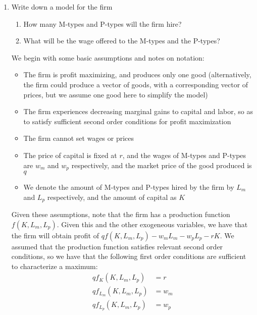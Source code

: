 \documentclass[12pt]{article}
\begin{document}
\begin{enumerate} 

	\item{Write down a model for the firm}
	
\begin{enumerate}

	\item{How many M-types and P-types will the firm hire?}
	\item{What will be the wage offered to the M-types and the P-types?}
	
\end{enumerate}

	We begin with some basic assumptions and notes on notation:
	
\begin{itemize}

	\item{The firm is profit maximizing, and produces only one good (alternatively, the firm could produce a vector of goods, with a corresponding vector of prices, but we assume one good here to simplify the model)}
	\item{The firm experiences decreasing marginal gains to capital and labor, so as to satisfy sufficient second order conditions for profit maximization}
	\item{The firm cannot set wages or prices}
	\item{The price of capital is fixed at $r$, and the wages of M-types and P-types are $w_m$ and $w_p$ respectively, and the market price of the good produced is $q$}
	\item{We denote the amount of M-types and P-types hired by the firm by $L_m$ and $L_p$ respectively, and the amount of capital as $K$}
\end{itemize}

Given these assumptions, note that the firm has a production function $f(K,L_m,L_p)$.  Given this and the other exogeneous variables, we have that the firm will obtain profit of $q f(K,L_m,L_p) - w_m L_m - w_p L_p - rK$.  We assumed that the production function satisfies relevant second order conditions, so we have that the following first order conditions are sufficient to characterize a maximum:
\begin{align*}
q f_K(K, L_m, L_p) &= r \\
q f_{L_m}(K, L_m, L_p) &= w_m \\
q f_{L_p}(K, L_m, L_p) &= w_p \\
\end{align*}


\end{enumerate}
\end{document}

